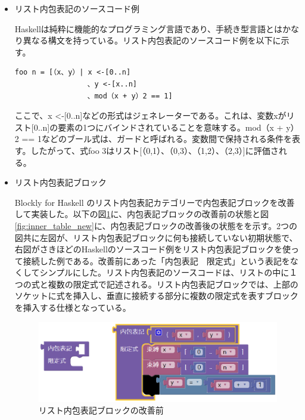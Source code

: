 \documentclass{risepaper}
\begin{document}
\begin{itemize}

\item リスト内包表記のソースコード例

Haskellは純粋に機能的なプログラミング言語であり、手続き型言語とはかなり異なる構文を持っている。リスト内包表記のソースコード例を以下に示す。

\begin{lstlisting}[basicstyle=\ttfamily\footnotesize]
foo n = [（x、y）| x <-[0..n]
                 、y <-[x..n]
                 、mod（x + y）2 == 1]
\end{lstlisting}

ここで、x <-[0..n]などの形式はジェネレーターである。これは、変数xがリスト[0..n]の要素の1つにバインドされていることを意味する。mod（x + y）2 == 1などのブール式は、ガードと呼ばれる。変数間で保持される条件を表す。したがって、式foo 3はリスト[（0,1）、（0,3）、（1,2）、（2,3）]に評価される。

\item リスト内包表記ブロック

Blockly for Haskell のリスト内包表記カテゴリーで内包表記ブロックを改善して実装した。以下の図\ref{fig:inner_table_old}に、内包表記ブロックの改善前の状態と図\ref{fig:inner_table_new}に、内包表記ブロックの改善後の状態をを示す。2つの図共に左図が、リスト内包表記ブロックに何も接続していない初期状態で、右図がさきほどのHaskellのソースコード例をリスト内包表記ブロックを使って接続した例である。改善前にあった「内包表記　限定式」という表記をなくしてシンプルにした。リスト内包表記のソースコードは、リストの中に１つの式と複数の限定式で記述される。リスト内包表記ブロックでは、上部のソケットに式を挿入し、垂直に接続する部分に複数の限定式を表すブロックを挿入する仕様となっている。


\begin{figure}[h]
\begin{center}
\includegraphics[scale=0.5]{img/inner_table.eps}
\caption{リスト内包表記ブロックの改善前}%
\label{fig:inner_table_old}
\end{center}%
\end{figure}%


\end{itemize}
\end{document}
